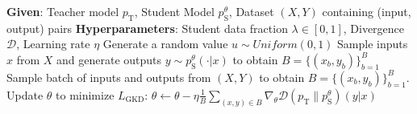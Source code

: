 \documentclass{article} %
\def\gL{{\mathcal{L}}}
\def\D{\mathcal{D}}
\newcommand{\stu}[0]{p_{\text{S}}}
\newcommand{\tea}[0]{p_{\text{T}}}
\newcommand{\mfg}[1]{{\color{purple}[mfg: #1]}}
\begin{document}






\begin{algorithm}[t]
\caption{Generalized Knowledge Distillation~(GKD)}\label{alg1}
\begin{algorithmic}[1]
  \STATE \textbf{Given}: Teacher model $\tea$, Student Model $\stu^\theta$, Dataset $(X, Y)$ containing (input, output) pairs
  \STATE \textbf{Hyperparameters}: Student data fraction $\lambda \in [0, 1]$, Divergence $\D$, Learning rate $\eta$
  \STATE Generate a random value $u \sim Uniform(0,1)$
    \STATE Sample inputs $x$ from $X$ and generate outputs $y \sim \stu^\theta(\cdot | x)$  to obtain $B = \{(x_b, y_b)\}_{b=1}^{B}$
  \ELSE
    \STATE Sample batch of inputs and outputs from $(X, Y)$ to obtain $B = \{(x_b, y_b)\}_{b=1}^{B}$.
  \ENDIF
  \STATE Update $\theta$ to minimize $L_{\mathrm{GKD}}$: $\theta \gets \theta - \eta \frac{1}{B} \sum_{(x, y) \in B} \nabla_\theta \D(\tea \| \stu^\theta) (y|x)$
  \ENDFOR
\end{algorithmic}
\vspace{-0.1cm}
\end{algorithm}
\end{document}
